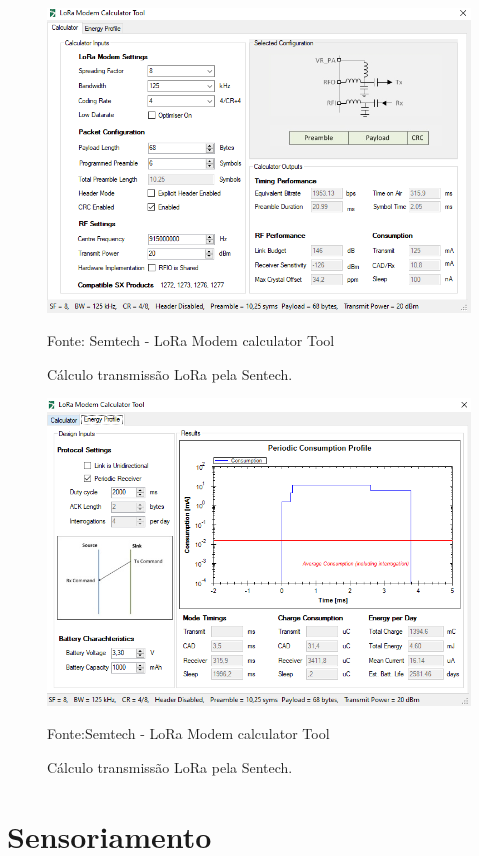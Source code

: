 \begin{figure}[H]
  \centering
  \includegraphics[scale=0.65]{figuras/calculo LoRa1.1.png}
  \caption{Cálculo transmissão LoRa pela Sentech. }
 { \footnotesize Fonte: Semtech - LoRa Modem calculator Tool} 
  \label{fig:calculo LoRa1}
\end{figure}


\begin{figure}[H]
  \centering
  \includegraphics[scale=0.65]{figuras/calculo LoRa1.2.png}
  \caption{Cálculo transmissão LoRa pela Sentech. }
 { \footnotesize Fonte:Semtech - LoRa Modem calculator Tool} 
  \label{fig:calculo LoRa2}
\end{figure}


\section{Sensoriamento}

